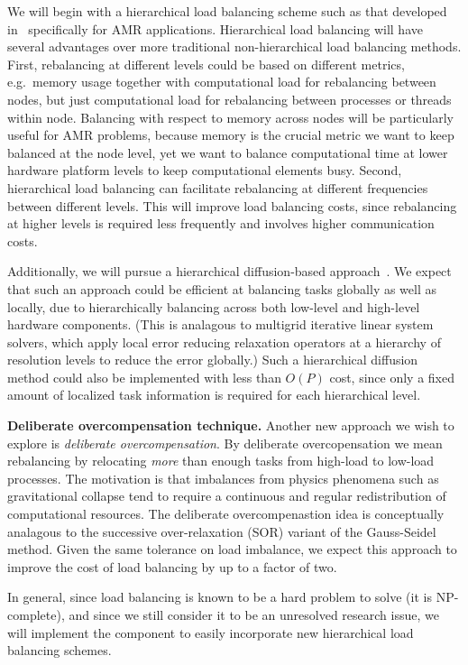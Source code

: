\documentclass[10pt,twocolumn]{article}
\begin{document}
We will begin with a hierarchical load balancing scheme such as that
developed in~\cite{LaTa06} specifically for AMR applications.
Hierarchical load balancing will have several advantages over more
traditional non-hierarchical load balancing methods.  First,
rebalancing at different levels could be based on different metrics,
e.g.~memory usage together with computational load for rebalancing
between nodes, but just computational load for rebalancing between
processes or threads within node.  Balancing with respect to memory
across nodes will be particularly useful for AMR problems, because
memory is the crucial metric we want to keep balanced at the node
level, yet we want to balance computational time at lower hardware
platform levels to keep computational elements busy.  Second,
hierarchical load balancing can facilitate rebalancing at different
frequencies between different levels.  This will improve load
balancing costs, since rebalancing at higher levels is required less
frequently and involves higher communication costs.

Additionally, we will pursue a hierarchical diffusion-based
approach~\cite{ScKa97}.  We expect that such an approach could be
efficient at balancing tasks globally as well as locally, due to
hierarchically balancing across both low-level and high-level hardware
components.  (This is analagous to multigrid iterative linear system
solvers, which apply local error reducing relaxation operators at a
hierarchy of resolution levels to reduce the error globally.)  Such a
hierarchical diffusion method could also be implemented with less than
$O(P)$ cost, since only a fixed amount of localized task information
is required for each hierarchical level.

\textbf{Deliberate overcompensation technique.}
%
Another new approach we wish to explore is \textit{deliberate
  overcompensation}.  By deliberate overcopensation we mean
rebalancing by relocating \textit{more} than enough tasks from
high-load to low-load processes.  The motivation is that imbalances
from physics phenomena such as gravitational collapse tend to require
a continuous and regular redistribution of computational resources.
The deliberate overcompenastion idea is conceptually analagous to the
successive over-relaxation (SOR) variant of the Gauss-Seidel method.
Given the same tolerance on load imbalance, we expect this approach to
improve the cost of load balancing by up to a factor of two.

In general, since load balancing is known to be a hard problem to
solve (it is NP-complete), and since we still consider it to be an
unresolved research issue, we will implement the 
component to easily incorporate new hierarchical load balancing
schemes.
\end{document}
